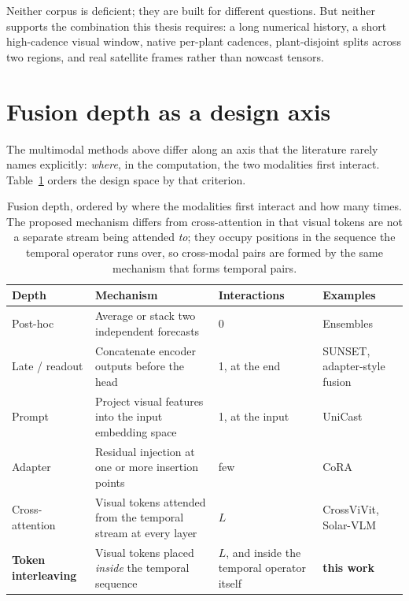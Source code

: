 Neither corpus is deficient; they are built for different questions. But neither supports
the combination this thesis requires: a long numerical history, a short high-cadence visual
window, native per-plant cadences, plant-disjoint splits across two regions, and real
satellite frames rather than nowcast tensors.

\section{Fusion depth as a design axis}
\label{sec:fusion-depth}

The multimodal methods above differ along an axis that the literature rarely names
explicitly: \emph{where}, in the computation, the two modalities first interact.
Table~\ref{tab:fusion-depth} orders the design space by that criterion.

\begin{table}[h!]
\centering
\small
\begin{tabular}{p{2.9cm} p{4.3cm} p{3.0cm} p{3.0cm}}
\hline
\textbf{Depth} & \textbf{Mechanism} & \textbf{Interactions} & \textbf{Examples} \\
\hline
Post-hoc & Average or stack two independent forecasts & 0 & Ensembles \\
Late / readout & Concatenate encoder outputs before the head & 1, at the end &
SUNSET, adapter-style fusion \\
Prompt & Project visual features into the input embedding space & 1, at the input &
UniCast \\
Adapter & Residual injection at one or more insertion points & few &
CoRA \\
Cross-attention & Visual tokens attended from the temporal stream at every layer & $L$ &
CrossViVit, Solar-VLM \\
\textbf{Token interleaving} & Visual tokens placed \emph{inside} the temporal sequence &
$L$, and inside the temporal operator itself & \textbf{this work} \\
\hline
\end{tabular}
\caption{Fusion depth, ordered by where the modalities first interact and how many times.
The proposed mechanism differs from cross-attention in that visual tokens are not a separate
stream being attended \emph{to}; they occupy positions in the sequence the temporal operator
runs over, so cross-modal pairs are formed by the same mechanism that forms temporal pairs.}
\label{tab:fusion-depth}
\end{table}

